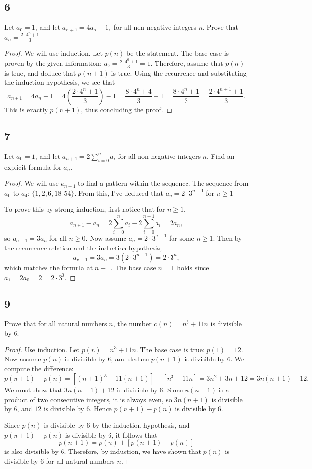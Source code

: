 \documentclass{amsart}
\begin{document}
\subsection*{6} Let $a_0=1$, and let $a_{n+1} = 4a_n -1,$ for all non-negative integers $n$. Prove that $a_n = \frac{2 \cdot 4^n+1}{3}$ 
\begin{proof}
      We will use induction. Let $p(n)$ be the statement. The base case is proven by the given information: $a_0 = \frac{2\cdot 4^0+1}{3} = 1$. Therefore, assume that $p(n)$ is true, and deduce that $p(n+1)$ is true. Using the recurrence and substituting the induction hypothesis, we see that
    \[
    a_{n+1} = 4a_n - 1 = 4\left(\frac{2\cdot 4^n+1}{3}\right)-1 = \frac{8\cdot 4^n+4}{3}-1 = \frac{8\cdot 4^n+1}{3} = \frac{2\cdot 4^{n+1}+1}{3}.
    \]
    This is exactly $p(n+1)$, thus concluding the proof.
\end{proof}
\subsection*{7} Let $a_0=1$, and let $a_{n+1} = 2 \sum_{i=0}^{n}a_i$ for all non-negative integers $n$. Find an explicit formula for $a_n$.
\begin{proof}
     We will use $a_{n+1}$ to find a pattern within the sequence. The sequence from $a_0$ to $a_4$: $\{1, 2, 6, 18 , 54 \}$. From this, I've deduced that $a_n = 2 \cdot 3^{n-1}$ for $n \geq 1$.
 
    To prove this by strong induction, first notice that for $n\geq 1$,
    \[
    a_{n+1}-a_n = 2\sum_{i=0}^{n}a_i - 2\sum_{i=0}^{n-1}a_i = 2a_n,
    \]
    so $a_{n+1} = 3a_n$ for all $n \geq 0$. Now assume $a_n = 2\cdot 3^{n-1}$ for some $n\geq 1$. Then by the recurrence relation and the induction hypothesis,
    \[
    a_{n+1} = 3a_n = 3(2\cdot 3^{n-1}) = 2\cdot 3^n,
    \]
    which matches the formula at $n+1$. The base case $n=1$ holds since $a_1 = 2a_0 = 2 = 2\cdot 3^0$.
\end{proof}
\subsection*{9} Prove that for all natural numbers $n$, the number $a(n) = n^3 + 11n$ is divisible by 6.
\begin{proof}
    Use induction. Let $p(n) = n^3 + 11n$. The base case is true: $p(1) = 12$. Now assume $p(n)$ is divisible by 6, and deduce $p(n+1)$ is divisible by 6. We compute the difference:
    \[
    p(n+1) - p(n) = \left[(n+1)^3+11(n+1)\right] - \left[n^3+11n\right] = 3n^2+3n+12 = 3n(n+1)+12.
    \]
    We must show that $3n(n+1)+12$ is divisible by 6. Since $n(n+1)$ is a product of two consecutive integers, it is always even, so $3n(n+1)$ is divisible by 6, and $12$ is divisible by 6. Hence $p(n+1)-p(n)$ is divisible by 6.
 
    Since $p(n)$ is divisible by 6 by the induction hypothesis, and $p(n+1)-p(n)$ is divisible by 6, it follows that
    \[
    p(n+1) = p(n) + \left[p(n+1)-p(n)\right]
    \]
    is also divisible by 6. Therefore, by induction, we have shown that $p(n)$ is divisible by 6 for all natural numbers $n$.
\end{proof}
\end{document}

